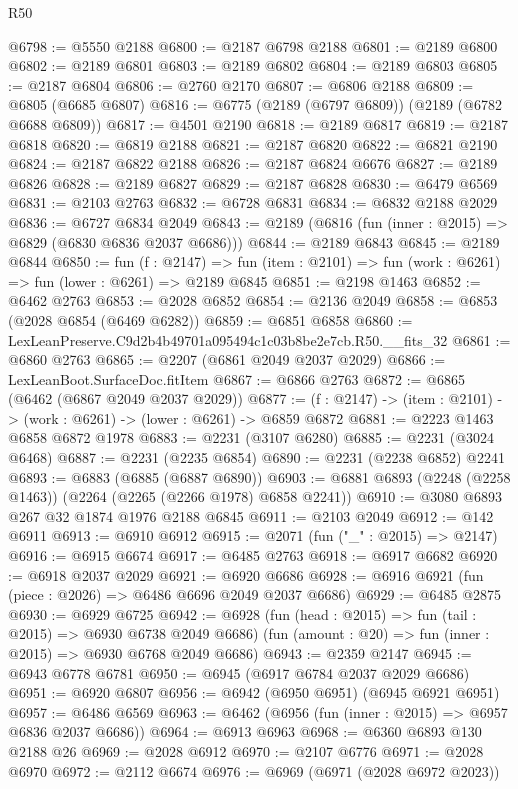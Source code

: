 \begin{lexlean}{R50}
\begin{coremodule}
@6798 := @5550 @2188
@6800 := @2187 @6798 @2188
@6801 := @2189 @6800
@6802 := @2189 @6801
@6803 := @2189 @6802
@6804 := @2189 @6803
@6805 := @2187 @6804
@6806 := @2760 @2170
@6807 := @6806 @2188
@6809 := @6805 (@6685 @6807)
@6816 := @6775 (@2189 (@6797 @6809)) (@2189 (@6782 @6688 @6809))
@6817 := @4501 @2190
@6818 := @2189 @6817
@6819 := @2187 @6818
@6820 := @6819 @2188
@6821 := @2187 @6820
@6822 := @6821 @2190
@6824 := @2187 @6822 @2188
@6826 := @2187 @6824 @6676
@6827 := @2189 @6826
@6828 := @2189 @6827
@6829 := @2187 @6828
@6830 := @6479 @6569
@6831 := @2103 @2763
@6832 := @6728 @6831
@6834 := @6832 @2188 @2029
@6836 := @6727 @6834 @2049
@6843 := @2189 (@6816 (fun (inner : @2015) => @6829 (@6830 @6836 @2037 @6686)))
@6844 := @2189 @6843
@6845 := @2189 @6844
@6850 := fun (f : @2147) =>
  fun (item : @2101) => fun (work : @6261) => fun (lower : @6261) => @2189 @6845
@6851 := @2198 @1463
@6852 := @6462 @2763
@6853 := @2028 @6852
@6854 := @2136 @2049
@6858 := @6853 (@2028 @6854 (@6469 @6282))
@6859 := @6851 @6858
@6860 := LexLeanPreserve.C9d2b4b49701a095494c1c03b8be2e7cb.R50.__fits_32
@6861 := @6860 @2763
@6865 := @2207 (@6861 @2049 @2037 @2029)
@6866 := LexLeanBoot.SurfaceDoc.fitItem
@6867 := @6866 @2763
@6872 := @6865 (@6462 (@6867 @2049 @2037 @2029))
@6877 := (f : @2147) -> (item : @2101) -> (work : @6261) -> (lower : @6261) -> @6859 @6872
@6881 := @2223 @1463 @6858 @6872 @1978
@6883 := @2231 (@3107 @6280)
@6885 := @2231 (@3024 @6468)
@6887 := @2231 (@2235 @6854)
@6890 := @2231 (@2238 @6852) @2241
@6893 := @6883 (@6885 (@6887 @6890))
@6903 := @6881 @6893 (@2248 (@2258 @1463)) (@2264 (@2265 (@2266 @1978) @6858 @2241))
@6910 := @3080 @6893 @267 @32 @1874 @1976 @2188 @6845
@6911 := @2103 @2049
@6912 := @142 @6911
@6913 := @6910 @6912
@6915 := @2071 (fun ("_" : @2015) => @2147)
@6916 := @6915 @6674
@6917 := @6485 @2763
@6918 := @6917 @6682
@6920 := @6918 @2037 @2029
@6921 := @6920 @6686
@6928 := @6916 @6921 (fun (piece : @2026) => @6486 @6696 @2049 @2037 @6686)
@6929 := @6485 @2875
@6930 := @6929 @6725
@6942 := @6928
    (fun (head : @2015) => fun (tail : @2015) => @6930 @6738 @2049 @6686)
    (fun (amount : @20) => fun (inner : @2015) => @6930 @6768 @2049 @6686)
@6943 := @2359 @2147
@6945 := @6943 @6778 @6781
@6950 := @6945 (@6917 @6784 @2037 @2029 @6686)
@6951 := @6920 @6807
@6956 := @6942 (@6950 @6951) (@6945 @6921 @6951)
@6957 := @6486 @6569
@6963 := @6462 (@6956 (fun (inner : @2015) => @6957 @6836 @2037 @6686))
@6964 := @6913 @6963
@6968 := @6360 @6893 @130 @2188 @26
@6969 := @2028 @6912
@6970 := @2107 @6776
@6971 := @2028 @6970
@6972 := @2112 @6674
@6976 := @6969 (@6971 (@2028 @6972 @2023))

\end{coremodule}
\end{lexlean}
